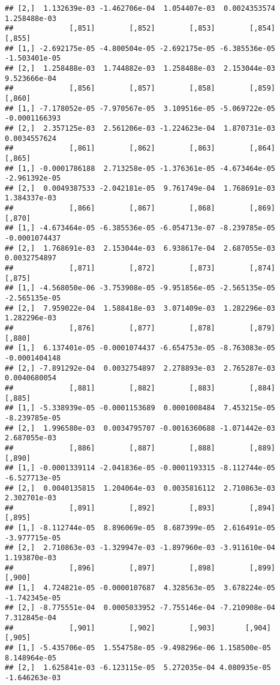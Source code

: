 \documentclass[
]{article}
\begin{document}
\begin{verbatim}
## [2,]  1.132639e-03 -1.462706e-04  1.054407e-03  0.0024353574  1.258488e-03
##             [,851]        [,852]        [,853]        [,854]        [,855]
## [1,] -2.692175e-05 -4.800504e-05 -2.692175e-05 -6.385536e-05 -1.503401e-05
## [2,]  1.258488e-03  1.744882e-03  1.258488e-03  2.153044e-03  9.523666e-04
##             [,856]        [,857]        [,858]        [,859]        [,860]
## [1,] -7.178052e-05 -7.970567e-05  3.109516e-05 -5.069722e-05 -0.0001166393
## [2,]  2.357125e-03  2.561206e-03 -1.224623e-04  1.870731e-03  0.0034557624
##             [,861]        [,862]        [,863]        [,864]        [,865]
## [1,] -0.0001786188  2.713258e-05 -1.376361e-05 -4.673464e-05 -2.961392e-05
## [2,]  0.0049387533 -2.042181e-05  9.761749e-04  1.768691e-03  1.384337e-03
##             [,866]        [,867]        [,868]        [,869]        [,870]
## [1,] -4.673464e-05 -6.385536e-05 -6.054713e-07 -8.239785e-05 -0.0001074437
## [2,]  1.768691e-03  2.153044e-03  6.938617e-04  2.687055e-03  0.0032754897
##             [,871]        [,872]        [,873]        [,874]        [,875]
## [1,] -4.568050e-06 -3.753908e-05 -9.951856e-05 -2.565135e-05 -2.565135e-05
## [2,]  7.959022e-04  1.588418e-03  3.071409e-03  1.282296e-03  1.282296e-03
##             [,876]        [,877]        [,878]        [,879]        [,880]
## [1,]  6.137401e-05 -0.0001074437 -6.654753e-05 -8.763083e-05 -0.0001404148
## [2,] -7.891292e-04  0.0032754897  2.278893e-03  2.765287e-03  0.0040680054
##             [,881]        [,882]        [,883]        [,884]        [,885]
## [1,] -5.338939e-05 -0.0001153689  0.0001008484  7.453215e-05 -8.239785e-05
## [2,]  1.996580e-03  0.0034795707 -0.0016360688 -1.071442e-03  2.687055e-03
##             [,886]        [,887]        [,888]        [,889]        [,890]
## [1,] -0.0001339114 -2.041836e-05 -0.0001193315 -8.112744e-05 -6.527713e-05
## [2,]  0.0040135815  1.204064e-03  0.0035816112  2.710863e-03  2.302701e-03
##             [,891]        [,892]        [,893]        [,894]        [,895]
## [1,] -8.112744e-05  8.896069e-05  8.687399e-05  2.616491e-05 -3.977715e-05
## [2,]  2.710863e-03 -1.329947e-03 -1.897960e-03 -3.911610e-04  1.193870e-03
##             [,896]        [,897]        [,898]        [,899]        [,900]
## [1,]  4.724821e-05 -0.0000107687  4.328563e-05  3.678224e-05 -1.742345e-05
## [2,] -8.775551e-04  0.0005033952 -7.755146e-04 -7.210908e-04  7.312845e-04
##             [,901]        [,902]        [,903]       [,904]        [,905]
## [1,] -5.435706e-05  1.554758e-05 -9.498296e-06 1.158500e-05  8.148964e-05
## [2,]  1.625841e-03 -6.123115e-05  5.272035e-04 4.080935e-05 -1.646263e-03

\end{verbatim}
\end{document}
